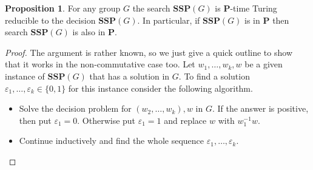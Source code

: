 \documentclass[11pt]{amsart}
\theoremstyle{definition}
\newtheorem{proposition}[theorem]{Proposition}
\def\P{{\mathbf{P}}}
\def\SSP{{\mathbf{SSP}}}
\begin{document}
\begin{proposition}
\label{pr:solutions-SSP}
For any group $G$ the search $\SSP(G)$ is $\P$-time Turing reducible to the decision $\SSP(G)$. In particular, if $\SSP(G)$ is in $\P$ then search $\SSP(G)$ is also in $\P$.
\end{proposition}
\begin{proof}
The argument is rather known, so we just give a quick outline to show that it works in the non-commutative case too. Let $w_1,\ldots,w_k,w$ be a given instance of $\SSP(G)$ that has a solution in $G$. To find a solution
$\varepsilon_1,\ldots,\varepsilon_k \in \{0,1\}$
for this instance consider the following algorithm.
\begin{itemize}
    \item
Solve the decision problem for $(w_2,\ldots,w_k),w$ in $G$. If the answer is positive, then
put $\varepsilon_1=0$. Otherwise put $\varepsilon_1=1$ and replace $w$ with $w_1^{-1}w$.
    \item
Continue inductively and find the whole sequence
$\varepsilon_1,\ldots,\varepsilon_k$.
\end{itemize}
\end{proof}
\end{document}
